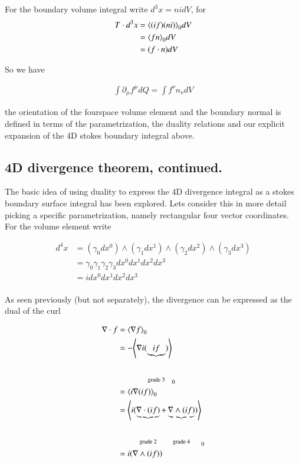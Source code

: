 For the boundary volume integral write $d^3 x = n i dV$, for
\begin{align*}
T \cdot d^3 x 
&= 
{\left\langle{{ (if) ( n i ) }}\right\rangle}_{0} dV \\
&= 
{\left\langle{{ f n }}\right\rangle}_{0} dV \\
&= 
(f \cdot n) dV
\end{align*}

So we have

\begin{align*}
\int \partial_\mu f^\mu dQ = \int f^\nu n_\nu dV
\end{align*}

the orientation of the fourspace volume element and the boundary normal is defined in terms of the parametrization, the duality relations and our explicit expansion of the 4D stokes boundary integral above.

\subsection{4D divergence theorem, continued.}

The basic idea of using duality to express the 4D divergence integral as a stokes boundary surface integral has been explored.  Lets consider this in more detail picking a specific parametrization, namely rectangular four vector coordinates.  For the volume element write

\begin{align*}
d^4 x 
&= ( \gamma_0 dx^0 ) \wedge ( \gamma_1 dx^1 ) \wedge ( \gamma_2 dx^2 ) \wedge ( \gamma_3 dx^3 ) \\
&= \gamma_0 \gamma_1 \gamma_2 \gamma_3 dx^0 dx^1 dx^2 dx^3 \\
&= i dx^0 dx^1 dx^2 dx^3 \\
\end{align*}

As seen previously (but not separately), the divergence can be expressed as the dual of the curl

\begin{align*}
\nabla \cdot f
&=
{\left\langle{{ \nabla f }}\right\rangle}_{0} \\
&=
-{\left\langle{{ \nabla i (\underbrace{i f}_{\text{grade 3}}) }}\right\rangle}_{0} \\
&=
{\left\langle{{ i \nabla(i f) }}\right\rangle}_{0} \\
&=
{\left\langle{{ i ( \underbrace{\nabla\cdot (i f)}_{\text{grade 2}} + \underbrace{\nabla\wedge (i f)}_{\text{grade 4}} ) }}\right\rangle}_{0} \\
&=
i (\nabla \wedge (i f)) \\
\end{align*}


